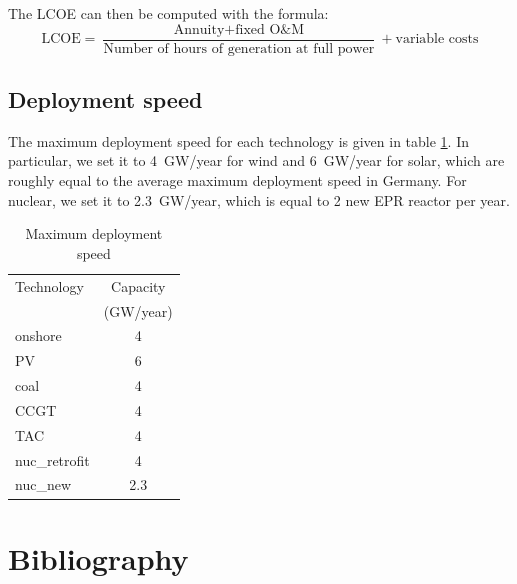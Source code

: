 \documentclass[authoryear]{elsarticle}
\begin{document}
The LCOE can then be computed with the formula:
$$\text{LCOE} = \frac{ \text{Annuity} + \text{fixed O\&M} } { \text{Number of hours of generation at full power}} +  \text{variable costs}$$

\subsection{Deployment speed}

The maximum deployment speed for each technology is given in table \ref{tab:deploy_speed}. In particular, we set it to 4~GW/year for wind and 6~GW/year for solar, which are roughly equal to the average maximum deployment speed in Germany. For nuclear, we set it to 2.3~GW/year, which is equal to 2 new EPR reactor per year.

\begin{table}[!h]
	\centering
	\caption{Maximum deployment speed}
	\label{tab:deploy_speed}
	\begin{tabular}{lc}
		\toprule
		Technology & Capacity \\
		 & (GW/year) \\
		\midrule
		onshore & 4 \\
		PV & 6 \\
		coal & 4 \\
		CCGT & 4 \\
		TAC & 4 \\
		nuc\_retrofit & 4 \\
		nuc\_new & 2.3 \\
		\bottomrule
	\end{tabular}
\end{table}


\clearpage

\section*{Bibliography}

\end{document}

